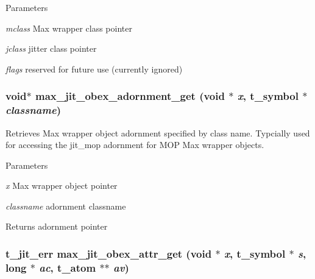 \begin{DoxyParams}{Parameters}
\item[{\em mclass}]Max wrapper class pointer \item[{\em jclass}]jitter class pointer \item[{\em flags}]reserved for future use (currently ignored) \end{DoxyParams}
\hypertarget{group__maxwrapmod_gae32503dc254a4f5fc1fb73fa0d7e0144}{
\subsubsection[{max\_\-jit\_\-obex\_\-adornment\_\-get}]{\setlength{\rightskip}{0pt plus 5cm}void$\ast$ max\_\-jit\_\-obex\_\-adornment\_\-get (void $\ast$ {\em x}, \/  {\bf t\_\-symbol} $\ast$ {\em classname})}}
\label{group__maxwrapmod_gae32503dc254a4f5fc1fb73fa0d7e0144}


Retrieves Max wrapper object adornment specified by class name. Typcially used for accessing the jit\_\-mop adornment for MOP Max wrapper objects.


\begin{DoxyParams}{Parameters}
\item[{\em x}]Max wrapper object pointer \item[{\em classname}]adornment classname\end{DoxyParams}
\begin{DoxyReturn}{Returns}
adornment pointer 
\end{DoxyReturn}
\hypertarget{group__maxwrapmod_ga43ca09c039a1eb78396401a33cfdac08}{
\subsubsection[{max\_\-jit\_\-obex\_\-attr\_\-get}]{\setlength{\rightskip}{0pt plus 5cm}t\_\-jit\_\-err max\_\-jit\_\-obex\_\-attr\_\-get (void $\ast$ {\em x}, \/  {\bf t\_\-symbol} $\ast$ {\em s}, \/  long $\ast$ {\em ac}, \/  {\bf t\_\-atom} $\ast$$\ast$ {\em av})}}
\label{group__maxwrapmod_ga43ca09c039a1eb78396401a33cfdac08}


